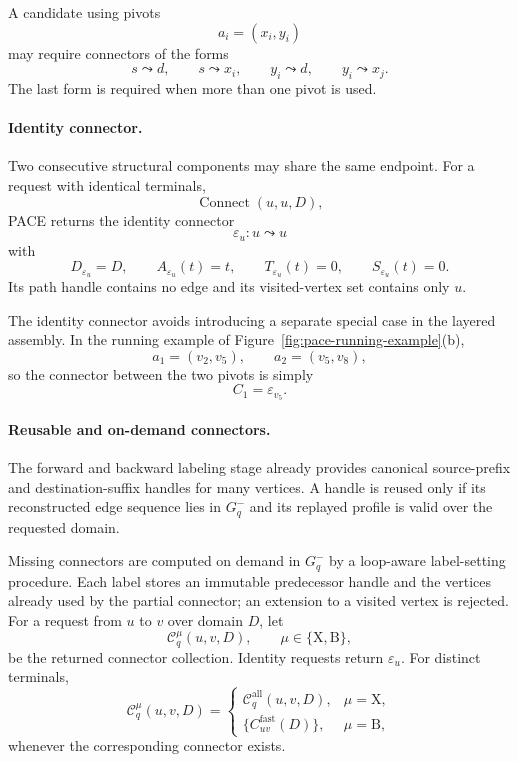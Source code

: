 \documentclass[a4paper,fleqn]{cas-dc}
\begin{document}
A candidate using pivots
\[
a_i=(x_i,y_i)
\]
may require connectors of the forms
\[
s\leadsto d,\qquad
s\leadsto x_i,\qquad
y_i\leadsto d,\qquad
y_i\leadsto x_j.
\]
The last form is required when more than one pivot is used.

\paragraph{Identity connector.}
Two consecutive structural components may share the same endpoint. For a
request with identical terminals,
\[
\operatorname{Connect}(u,u,D),
\]
PACE returns the identity connector
\[
\varepsilon_u:u\leadsto u
\]
with
\[
D_{\varepsilon_u}=D,
\qquad
A_{\varepsilon_u}(t)=t,
\qquad
T_{\varepsilon_u}(t)=0,
\qquad
S_{\varepsilon_u}(t)=0.
\]
Its path handle contains no edge and its visited-vertex set contains only
\(u\).

The identity connector avoids introducing a separate special case in the
layered assembly. In the running example of
Figure~\ref{fig:pace-running-example}(b),
\[
a_1=(v_2,v_5),
\qquad
a_2=(v_5,v_8),
\]
so the connector between the two pivots is simply
\[
C_1=\varepsilon_{v_5}.
\]

\paragraph{Reusable and on-demand connectors.}
The forward and backward labeling stage already provides canonical
source-prefix and destination-suffix handles for many vertices. A handle is
reused only if its reconstructed edge sequence lies in \(G_q^{-}\) and its
replayed profile is valid over the requested domain.

Missing connectors are computed on demand in \(G_q^{-}\) by a loop-aware
label-setting procedure. Each label stores an immutable predecessor handle and
the vertices already used by the partial connector; an extension to a visited
vertex is rejected. For a request from \(u\) to \(v\) over domain \(D\), let
\[
\mathcal C_q^{\mu}(u,v,D),
\qquad
\mu\in\{\mathrm X,\mathrm B\},
\]
be the returned connector collection. Identity requests return
\(\varepsilon_u\). For distinct terminals,
\[
\mathcal C_q^{\mu}(u,v,D)
=
\begin{cases}
\mathcal C_q^{\mathrm{all}}(u,v,D), & \mu=\mathrm X,\\[0.6ex]
\{C_{uv}^{\mathrm{fast}}(D)\}, & \mu=\mathrm B,
\end{cases}
\]
whenever the corresponding connector exists.
\end{document}
